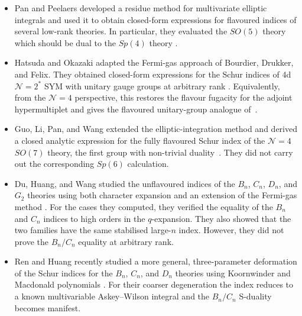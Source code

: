 \begin{itemize}
  \item Pan and Peelaers developed a residue method for multivariate elliptic
        integrals and used it to obtain closed-form expressions for flavoured
        indices of several low-rank theories. In particular, they evaluated the
        $SO(5)$ theory which should be dual to the $Sp(4)$ theory
        \cite{Pan:2021ulr}.

  \item Hatsuda and Okazaki adapted the Fermi-gas approach of Bourdier,
        Drukker, and Felix. They obtained closed-form expressions for the Schur
        indices of 4d $\mathcal N=2^*$ SYM with unitary gauge groups at
        arbitrary rank \cite{Hatsuda:2022xdv}. Equivalently, from the $\mathcal
        N=4$ perspective, this restores the flavour fugacity for the adjoint
        hypermultiplet and gives the flavoured unitary-group analogue
        of~\cite{Bourdier:2015wda}.

  \item Guo, Li, Pan, and Wang extended the elliptic-integration method and
        derived a closed analytic expression for the fully flavoured Schur
        index of the $\mathcal N=4$ $SO(7)$ theory, the first group with
        non-trivial duality~\cite{Guo:2023qly}. They did not carry out the
        corresponding $Sp(6)$ calculation.

  \item Du, Huang, and Wang studied the unflavoured indices of the $B_n$,
        $C_n$, $D_n$, and $G_2$ theories using both character expansion and an
        extension of the Fermi-gas method \cite{Du:2023pbn}. For the cases they
        computed, they verified the equality of the $B_n$ and $C_n$ indices to
        high orders in the $q$-expansion. They also showed that the two
        families have the same stabilised large-$n$ index. However, they did
        not prove the $B_n/C_n$ equality at arbitrary rank.

  \item Ren and Huang recently studied a more general, three-parameter
        deformation of the Schur indices for the $B_n$, $C_n$, and $D_n$
        theories using Koornwinder and Macdonald polynomials
        \cite{RenHuang2026BCD}. For their coarser degeneration the index reduces
        to a known multivariable Askey--Wilson integral and the $B_n/C_n$
        S-duality becomes manifest.

\end{itemize}

